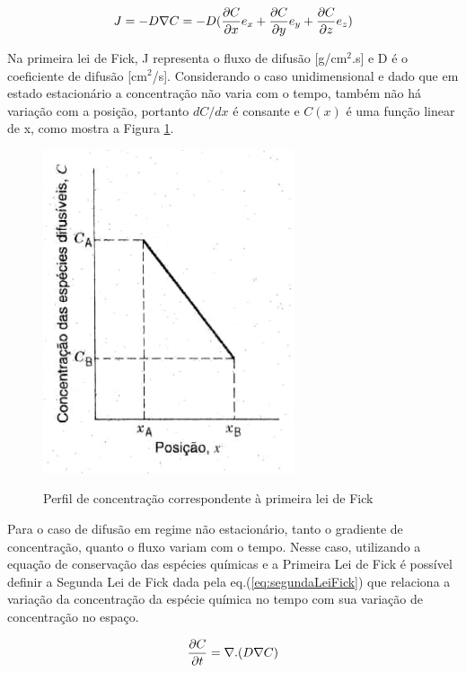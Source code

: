 \documentclass[]{politex}
\begin{document}
\begin{equation} \label{eq:primeiraLeiFick}
J = -D\nabla C = -D(\pdv{C}{x}e_x + \pdv{C}{y}e_y + \pdv{C}{z}e_z)
\end{equation}

	Na primeira lei de Fick, J representa o fluxo de difusão [g/cm$^2$.s] e D é o coeficiente de difusão [cm$^2$/s]. Considerando o caso unidimensional e dado que em estado estacionário a concentração não varia com o tempo, também não há variação com a posição, portanto $dC/dx$ é consante e $C(x)$ é uma função linear de x, como mostra a Figura \ref{fig:primeiraLei}. \par
	
	\begin{figure}[ht]
	\caption{Perfil de concentração correspondente à primeira lei de Fick}
	\includegraphics{primeiraLei}
	\label{fig:primeiraLei}
	\centering
	\end{figure}

	Para o caso de difusão em regime não estacionário, tanto o gradiente de concentração, quanto o fluxo variam com o tempo. Nesse caso, utilizando a equação de conservação das espécies químicas e a Primeira Lei de Fick é possível definir a Segunda Lei de Fick dada pela eq.(\autoref{eq:segundaLeiFick}) que relaciona a variação da concentração da espécie química no tempo com sua variação de concentração no espaço. \par

\begin{equation} \label{eq:segundaLeiFick}
 \pdv{C}{t} = \nabla.(D\nabla C)
\end{equation}
\end{document}
